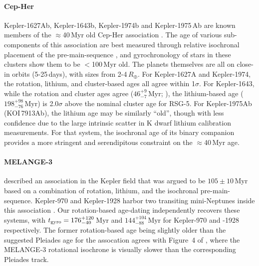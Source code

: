\documentclass[11pt,twocolumn,tighten]{aastex63}
\begin{document}
\paragraph{Cep-Her}
Kepler-1627Ab, Kepler-1643b, Kepler-1974b and Kepler-1975\,Ab are
known members of the $\approx$40\,Myr old Cep-Her association
\citep{Bouma_2022a,Bouma_2022b}.  The age of various sub-components of
this association are best measured through relative isochronal
placement of the pre-main-sequence \citep[see][]{Bouma_2022b}, and
gyrochronology of stars in these clusters show them to be $<$100\,Myr
old.  The planets themselves are all on close-in orbits (5-25\,days),
with sizes from 2-4\,$R_\oplus$.  For Kepler-1627A and Kepler-1974,
the rotation, lithium, and cluster-based ages all agree within
1$\sigma$.  For Kepler-1643, while the rotation and cluster ages agree
($46^{+9}_{-7}$\,Myr; \citealt{Bouma_2022b}), the lithium-based age
($198^{+98}_{-76}$\,Myr) is 2.0$\sigma$ above the nominal cluster age
for RSG-5.  For Kepler-1975Ab (KOI\,7913Ab), the lithium age may be
similarly ``old'', though with less confidence due to the large
intrinsic scatter in K dwarf lithium calibration measurements.  For
that system, the isochronal age of its binary companion provides a
more stringent and serendipitous constraint on the $\approx$40\,Myr
age.

\paragraph{MELANGE-3}
\citet{2022AJ....164...88B} described an association in the Kepler
field that was argued to be $105\pm10$\,Myr based on a combination of
rotation, lithium, and the isochronal pre-main-sequence.  Kepler-970
and Kepler-1928 harbor two transiting mini-Neptunes inside this
association \citep{2022AJ....164...88B}.  Our rotation-based
age-dating independently recovers these systems, with $t_{\rm
gyro}=176_{-40}^{+120}$\,Myr and $144_{-88}^{+104}$\,Myr for
Kepler-970 and -1928 respectively.  The former rotation-based age
being slightly older than the suggested Pleiades age for the
assocation agrees with Figure~4 of \citet{2022AJ....164...88B}, where
the MELANGE-3 rotational isochrone is visually slower than
the corresponding Pleiades track.
\end{document}
